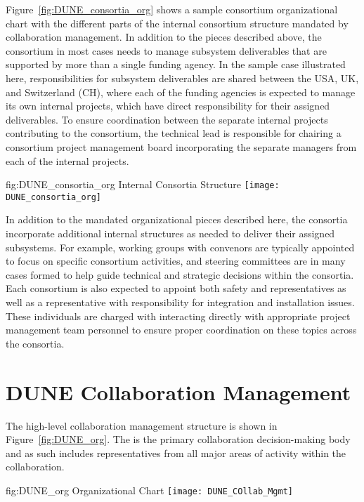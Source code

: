 Figure~\ref{fig:DUNE_consortia_org} shows a sample consortium organizational   %
chart with the different parts of the internal consortium structure mandated 
by  collaboration management.  In addition to the pieces described 
above, the consortium in most cases needs to manage subsystem deliverables 
that are supported by more than a single funding agency.  In the sample case 
illustrated here, responsibilities for subsystem deliverables are shared 
between the USA, UK, and Switzerland (CH), where each of the 
funding agencies is expected to manage its own internal projects, which have
direct responsibility for their assigned deliverables.  To ensure coordination
between the separate internal projects contributing to the consortium, the 
technical lead is responsible for chairing a consortium project management 
board incorporating the separate managers from each of the internal projects.   
\begin{dunefigure}{fig:DUNE_consortia_org}
  { Internal Consortia Structure}
  \texttt{[image: DUNE\_consortia\_org]}
\end{dunefigure}

In addition to the mandated organizational pieces described here, the consortia 
incorporate additional internal structures as needed to deliver their assigned 
subsystems.  For example, working groups with convenors are typically appointed 
to focus on specific consortium activities, and steering committees are in many 
cases formed to help guide technical and strategic decisions within the consortia.
Each consortium is also expected to appoint both safety and  
representatives as well as a representative with responsibility for integration 
and installation issues.  These individuals are charged with interacting directly 
with appropriate project management team personnel to ensure proper coordination 
on these topics across the consortia.        

\section{DUNE Collaboration Management}
\label{sec:dune_mgmt}

The high-level  collaboration management structure is shown 
in Figure~\ref{fig:DUNE_org}.  The   is the primary
collaboration decision-making body and as such includes representatives 
from all major areas of activity within the collaboration.
\begin{dunefigure}{fig:DUNE_org}
  { Organizational Chart}
  \texttt{[image: DUNE\_COllab\_Mgmt]}
\end{dunefigure}

